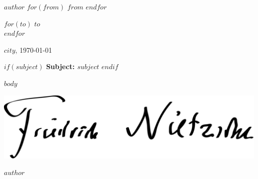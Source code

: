 \documentclass[$fontsize$, a4paper]{article}
\begin{document}
\small
\textsc{\textbf{$author$}}
$for(from)$
\textbullet{} \textsc{$from$}
$endfor$

\vspace{1em}

\normalsize \sffamily
$for(to)$
$to$\\
$endfor$

\vspace{3em}

\rmfamily
\begin{flushright}
  $city$, \today
\end{flushright}

\vspace{1em}

$if(subject)$
\textbf{Subject: $subject$}
$endif$

\vspace{1em}

$body$

\begin{FlushRight}
  \includegraphics[height=5.5\baselineskip]{signature.pdf} \par
  $author$
\end{FlushRight}
\end{document}
